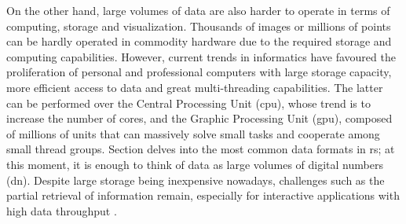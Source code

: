 On the other hand, large volumes of data are also harder to operate in terms of computing, storage and visualization. Thousands of images or millions of points can be hardly operated in commodity hardware due to the required storage and computing capabilities. However, current trends in informatics have favoured the proliferation of personal and professional computers with large storage capacity, more efficient access to data and great multi-threading capabilities. The latter can be performed over the Central Processing Unit (\acrshort{cpu}), whose trend is to increase the number of cores, and the Graphic Processing Unit (\acrshort{gpu}), composed of millions of units that can massively solve small tasks and cooperate among small thread groups. Section  delves into the most common data formats in \acrshort{rs}; at this moment, it is enough to think of data as large volumes of digital numbers (\acrshort{dn}). Despite large storage being inexpensive nowadays, challenges such as the partial retrieval of information remain, especially for interactive applications with high data throughput \cite{bejar-martos_strategies_2022, ogayar-anguita_nested_2023}. 

